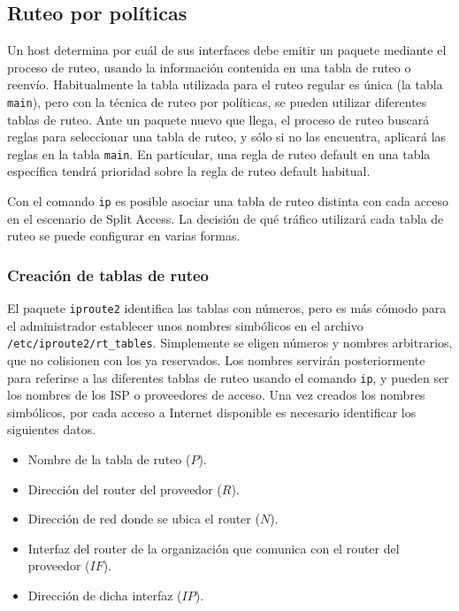  

\subsection{Ruteo por políticas}
Un host determina por cuál de sus interfaces debe emitir un paquete mediante el proceso de ruteo, usando la información contenida en una tabla de ruteo o reenvío. Habitualmente la tabla utilizada para el ruteo regular es única (la tabla \texttt{main}), pero con la técnica de ruteo por políticas, se pueden utilizar diferentes tablas de ruteo. Ante un paquete nuevo que llega, el proceso de ruteo buscará reglas para seleccionar una tabla de ruteo, y sólo si no las encuentra, aplicará las reglas en la tabla \texttt{main}. En particular, una regla de ruteo default en una tabla específica tendrá prioridad sobre la regla de ruteo default habitual. 

Con el comando \texttt{ip} es posible asociar una tabla de ruteo distinta con cada acceso en el escenario de Split Access. La decisión de qué tráfico utilizará cada tabla de ruteo se puede configurar en varias formas. 

\subsubsection{Creación de tablas de ruteo}
El paquete \texttt{iproute2} identifica las tablas con números, pero es más cómodo para el administrador establecer unos nombres simbólicos en el archivo \texttt{/etc/iproute2/rt\_tables}. Simplemente se eligen números y nombres arbitrarios, que no colisionen con los ya reservados. Los nombres servirán posteriormente para referirse a las diferentes tablas de ruteo usando el comando \texttt{ip}, y pueden ser los nombres de los ISP o proveedores de acceso. Una vez creados los nombres simbólicos, por cada acceso a Internet disponible es necesario identificar los siguientes datos.
\begin{itemize}
	\item Nombre de la tabla de ruteo ($P$).
	\item Dirección del router del proveedor ($R$).
	\item Dirección de red donde se ubica el router ($N$).
	\item Interfaz del router de la organización que comunica con el router del proveedor ($IF$).
	\item Dirección de dicha interfaz ($IP$).
\end{itemize}

